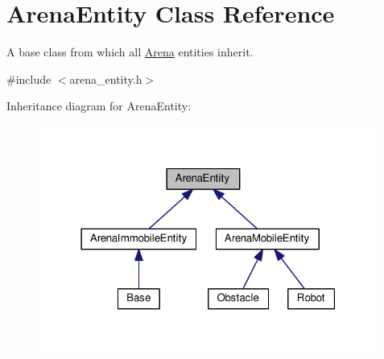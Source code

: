 \hypertarget{classArenaEntity}{}\section{Arena\+Entity Class Reference}
\label{classArenaEntity}


A base class from which all \hyperlink{classArena}{Arena} entities inherit.  




{\ttfamily \#include $<$arena\+\_\+entity.\+h$>$}



Inheritance diagram for Arena\+Entity\+:
\nopagebreak
\begin{figure}[H]
\begin{center}
\leavevmode
\includegraphics[width=316pt]{classArenaEntity__inherit__graph}
\end{center}
\end{figure}
